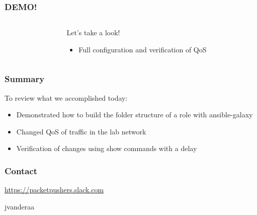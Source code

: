 \documentclass[aspectratio=169]{beamer}
\begin{document}
  \begin{frame}
    \frametitle{DEMO!}
    \begin{columns}
    \begin{column}{0.3\textwidth}
      \Huge
      \begin{center}
        \faDesktop 
        \hspace{.5cm}
        \faRocket     
      \end{center}
    \end{column}
    \begin{column}{0.7\textwidth}
      \huge 
        Let's take a look!
        \begin{itemize}
          \item Full configuration and verification of QoS
        \end{itemize}
    \end{column}
    \end{columns}
  \end{frame}

  \begin{frame}
    \frametitle{Summary}
      To review what we accomplished today:
      \begin{itemize}
        \item <2-> Demonstrated how to build the folder structure of a role with ansible-galaxy
        \item <3-> Changed QoS of traffic in the lab network
        \item <4-> Verification of changes using show commands with a delay
      \end{itemize}
  \end{frame}

  \begin{frame}
    \frametitle{Contact}
    \huge
    \begin{center}
      \url{https://packetpushers.slack.com}
    \end{center}
    \begin{center}
      \normalsize
      \faSlack \hspace{.1cm}jvanderaa  
    \end{center}
  \end{frame}
\end{document}
